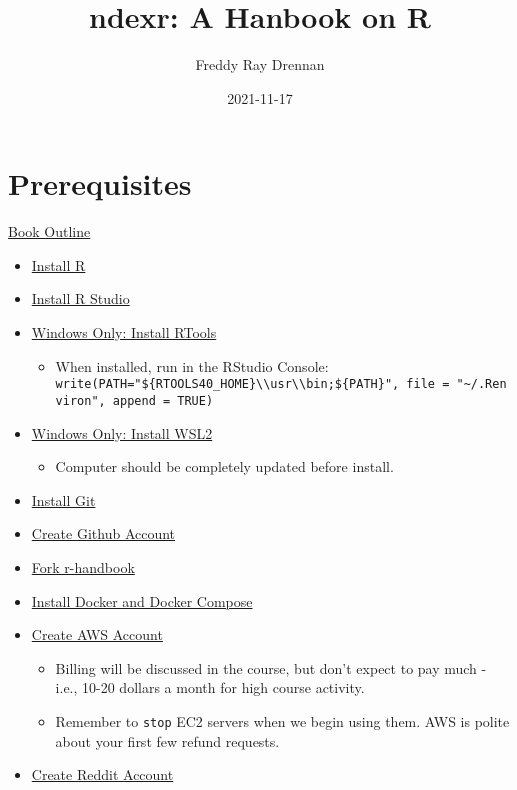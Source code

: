 \documentclass[
]{book}
\title{ndexr: A Hanbook on R}
\author{Freddy Ray Drennan}
\date{2021-11-17}
\providecommand{\tightlist}{%
  \setlength{\itemsep}{0pt}\setlength{\parskip}{0pt}}
\begin{document}
\maketitle

{
\setcounter{tocdepth}{1}
\tableofcontents
}
\hypertarget{prerequisites}{%
\chapter{Prerequisites}\label{prerequisites}}

\href{https://hackmd.io/vGRGEPo8QQyiG8gecWv71g}{Book Outline}

\begin{itemize}
\tightlist
\item
  \href{https://cran.r-project.org/}{Install R}
\item
  \href{https://www.rstudio.com/products/rstudio/download/}{Install R Studio}
\item
  \href{https://cran.r-project.org/bin/windows/Rtools/}{Windows Only: Install RTools}

  \begin{itemize}
  \tightlist
  \item
    When installed, run in the RStudio Console: \texttt{write(\textquotesingle{}PATH="\$\{RTOOLS40\_HOME\}\textbackslash{}\textbackslash{}usr\textbackslash{}\textbackslash{}bin;\$\{PATH\}"\textquotesingle{},\ file\ =\ "\textasciitilde{}/.Renviron",\ append\ =\ TRUE)}
  \end{itemize}
\item
  \href{https://www.omgubuntu.co.uk/how-to-install-wsl2-on-windows-10}{Windows Only: Install WSL2}

  \begin{itemize}
  \tightlist
  \item
    Computer should be completely updated before install.
  \end{itemize}
\item
  \href{https://git-scm.com/downloads}{Install Git}
\item
  \href{https://github.com/}{Create Github Account}
\item
  \href{https://github.com/fdrennan/r-handbook}{Fork r-handbook}
\item
  \href{https://docs.docker.com/get-docker/}{Install Docker and Docker Compose}
\item
  \href{https://aws.amazon.com/}{Create AWS Account}

  \begin{itemize}
  \tightlist
  \item
    Billing will be discussed in the course, but don't expect to pay much - i.e., 10-20 dollars a month for high course activity.
  \item
    Remember to \texttt{stop} EC2 servers when we begin using them. AWS is polite about your first few refund requests.
  \end{itemize}
\item
  \href{reddit.com}{Create Reddit Account}


\end{itemize}
\end{document}
